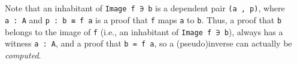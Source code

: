 \begin{code}
\AgdaSymbol{:}\AgdaSpace{}%
\AgdaSymbol{)}\AgdaSpace{}%
\AgdaSymbol{(}\AgdaSpace{}%
\AgdaSymbol{:}\AgdaSpace{}%
\AgdaSymbol{)}\<%
\\
\>[1][@{}l@{\AgdaIndent{0}}]%
\>[2]%
\>[17]\AgdaSpace{}%
\AgdaSpace{}%
\AgdaSpace{}%
\<%
\\
\>[2][@{}l@{\AgdaIndent{0}}]%
\>[15]\AgdaComment{----------------------------}\<%
\\
%
\>[2]%
\>[17]\AgdaSpace{}%
\AgdaSpace{}%
\AgdaSpace{}%
\<%
\\
%
\>[1]\AgdaSpace{}%
\AgdaSymbol{\{}\AgdaSymbol{\}\{}\AgdaSymbol{\}}\AgdaSpace{}%
\AgdaSpace{}%
\AgdaSpace{}%
\AgdaSpace{}%
\AgdaSpace{}%
\AgdaSymbol{=}\AgdaSpace{}%
\AgdaSpace{}%
\AgdaSpace{}%
\AgdaSpace{}%
\<%
\end{code}
\ccpad
Note that an inhabitant of \texttt{Image\ f\ ∋\ b} is a dependent pair \texttt{(a\ ,\ p)}, where \texttt{a\ :\ A} and \texttt{p\ :\ b\ ≡\ f\ a} is a proof that \texttt{f} maps \texttt{a} to \texttt{b}. Thus, a proof that \texttt{b} belongs to the image of \texttt{f} (i.e., an inhabitant of \texttt{Image\ f\ ∋\ b}), always has a witness \texttt{a\ :\ A}, and a proof that \texttt{b\ =\ f\ a}, so a (pseudo)inverse can actually be \emph{computed}.

